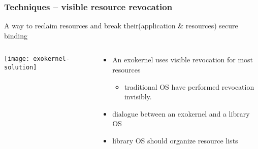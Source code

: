 \begin{frame}[plain]
	\frametitle{Techniques -- visible resource revocation}
	
   \Large
	A way to reclaim resources and break their(application \& resources) secure binding
	
	\begin{columns}
		
		\begin{column}{.5\textwidth}
			
			\texttt{[image: exokernel-solution]}
			
		\end{column}
		
		\begin{column}{.5\textwidth}
			
			\large
			\begin{itemize}
				\item An exokernel uses visible revocation for most resources
				\begin{itemize}
					\item traditional OS have performed revocation invisibly.

					
				\end{itemize}
			\item dialogue between an exokernel and a library OS
			\item library OS should organize resource lists
			\end{itemize}
		\end{column}
		
		
	\end{columns}
	
\end{frame}


